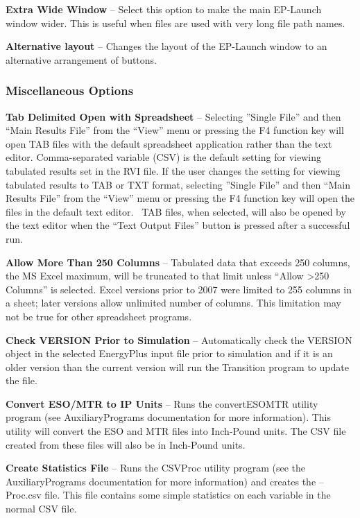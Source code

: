 \textbf{Extra Wide Window} -- Select this option to make the main EP-Launch window wider. This is useful when files are used with very long file path names.

\textbf{Alternative layout} -- Changes the layout of the EP-Launch window to an alternative arrangement of buttons.

\subsubsection{Miscellaneous Options}\label{miscellaneous-options}

\textbf{Tab Delimited Open with Spreadsheet} -- Selecting ''Single File'' and then ``Main Results File'' from the ``View'' menu or pressing the F4 function key will open TAB files with the default spreadsheet application rather than the text editor. Comma-separated variable (CSV) is the default setting for viewing tabulated results set in the RVI file. If the user changes the setting for viewing tabulated results to TAB or TXT format, selecting ''Single File'' and then ``Main Results File'' from the ``View'' menu or pressing the F4 function key will open the files in the default text editor.~ TAB files, when selected, will also be opened by the text editor when the ``Text Output Files'' button is pressed after a successful run.

\textbf{Allow More Than 250 Columns} -- Tabulated data that exceeds 250 columns, the MS Excel maximum, will be truncated to that limit unless ``Allow \textgreater{}250 Columns'' is selected. Excel versions prior to 2007 were limited to 255 columns in a sheet; later versions allow unlimited number of columns. This limitation may not be true for other spreadsheet programs.

\textbf{Check VERSION Prior to Simulation} -- Automatically check the VERSION object in the selected EnergyPlus input file prior to simulation and if it is an older version than the current version will run the Transition program to update the file.

\textbf{Convert ESO/MTR to IP Units} -- Runs the convertESOMTR utility program (see AuxiliaryPrograms documentation for more information). This utility will convert the ESO and MTR files into Inch-Pound units. The CSV file created from these files will also be in Inch-Pound units.

\textbf{Create Statistics File} -- Runs the CSVProc utility program (see the AuxiliaryPrograms documentation for more information) and creates the --Proc.csv file. This file contains some simple statistics on each variable in the normal CSV file.

